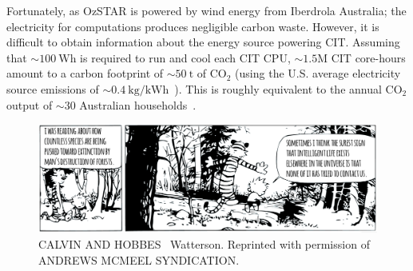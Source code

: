 Fortunately, as OzSTAR is powered by wind energy from Iberdrola Australia; the electricity for computations produces negligible carbon waste.
However, it is difficult to obtain information about the energy source powering CIT.
Assuming that ${\sim100\ \text{Wh}}$ is required to run and cool each CIT CPU, $\sim1.5\mathrm{M}$ CIT core-hours amount to a carbon footprint of ${\sim50\ \mathrm{t}}$ of ${\text{CO}_2}$ (using the U.S. average electricity source emissions of ${\sim0.4\ \text{kg/kWh}}$~\cite{greenhouse}).
This is roughly equivalent to the annual ${\text{CO}_2}$  output of $\sim30$ Australian households~\cite{}.










\begin{figure}
\begin{center}
\centerline{\includegraphics[width=1\linewidth]{figures/calvin_and_hobbes_2.png}}
  \caption*{\tiny CALVIN AND HOBBES \textcopyright\  Watterson. Reprinted with permission of ANDREWS MCMEEL SYNDICATION.}
\end{center}
\end{figure}